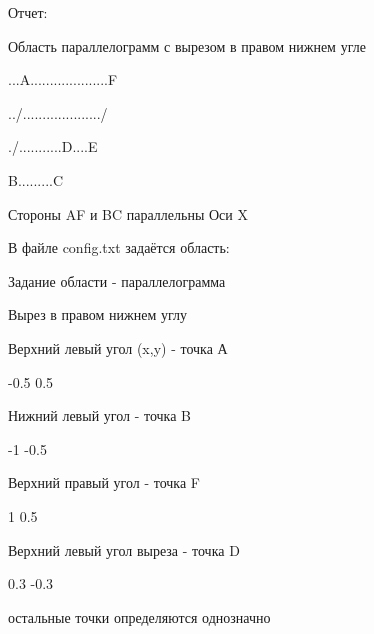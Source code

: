 \documentclass[a4paper,12pt]{article}
\begin{document}
Отчет:

Область параллелограмм с вырезом в правом нижнем угле

...A....................F
 
../..................../

./...........D....E
 
B.........C
 
Стороны AF и BC параллельны Оси X
 
В файле config.txt задаётся область:


 Задание области - параллелограмма

 Вырез в правом нижнем углу

 Верхний левый угол (x,y) - точка А

-0.5 0.5

 Нижний левый угол - точка B

-1 -0.5

 Верхний правый угол - точка F

1 0.5

 Верхний левый угол выреза - точка D

0.3 -0.3


остальные точки определяются однозначно
\end{document}
